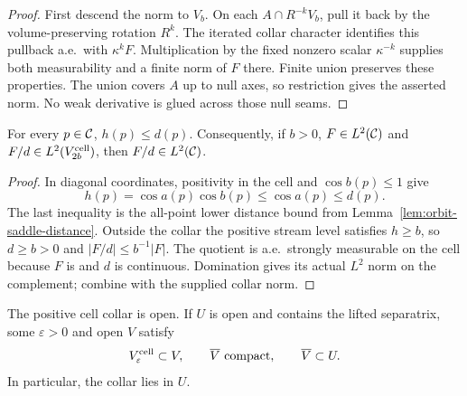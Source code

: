 \begin{proof}
\leanok
First descend the norm to $V_b$. On each $A\cap R^{-k}V_b$,
pull it back by the volume-preserving rotation $R^k$.
The iterated collar character identifies this pullback a.e.\ with
$\kappa^kF$. Multiplication by the fixed nonzero scalar
$\kappa^{-k}$ supplies both measurability and a finite norm of $F$ there.
Finite union preserves these properties. The union covers $A$
up to null axes, so restriction gives the asserted norm.
No weak derivative is glued across those null seams.
\end{proof}

\begin{lemma}
\label{lem:cell-interior-mass}
\leanok
For every $p\in\mathcal{C}$, $h(p)\le d(p)$.
Consequently, if $b>0$, $F\in L^2(\mathcal{C})$ and
$F/d\in L^2(V_{2b}^{\rm cell})$, then $F/d\in L^2(\mathcal{C})$.
\end{lemma}

\begin{proof}
\leanok
In diagonal coordinates, positivity in the cell and $\cos b(p)\le1$
give
\[
 h(p)=\cos a(p)\cos b(p)\le\cos a(p)\le d(p).
\]
The last inequality is the all-point lower distance bound from
Lemma~\ref{lem:orbit-saddle-distance}.
Outside the collar the positive stream level satisfies $h\ge b$,
so $d\ge b>0$ and $|F/d|\le b^{-1}|F|$.
The quotient is a.e.\ strongly measurable on the cell because $F$ is
and $d$ is continuous. Domination gives its actual $L^2$ norm on the
complement; combine with the supplied collar norm.
\end{proof}

\begin{lemma}
\label{lem:compact-cell-collar}
\leanok
The positive cell collar is open. If $U$ is open and contains the lifted
separatrix, some $\varepsilon>0$ and open $V$ satisfy
\[
 V_\varepsilon^{\rm cell}\subset V,\qquad
 \overline V\ \hbox{compact},\qquad \overline V\subset U .
\]
In particular, the collar lies in $U$.
\end{lemma}

